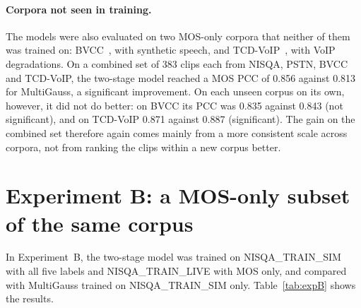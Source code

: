 \documentclass[
english,                 %
bibtex,                  %
includeExtraAbstracts, %
]{kththesis}
\numberwithin{listing}{chapter}
\begin{document}
\paragraph{Corpora not seen in training.} The models were also evaluated on two MOS-only corpora that neither of them was trained on: BVCC~\cite{cooper_ssw_2021}, with synthetic speech, and TCD-VoIP~\cite{harte_tcdvoip_2015}, with \gls{VoIP} degradations. On a combined set of 383 clips each from NISQA, PSTN, BVCC and TCD-VoIP, the two-stage model reached a MOS PCC of 0.856 against 0.813 for MultiGauss, a significant improvement. On each unseen corpus on its own, however, it did not do better: on BVCC its PCC was 0.835 against 0.843 (not significant), and on TCD-VoIP 0.871 against 0.887 (significant). The gain on the combined set therefore again comes mainly from a more consistent scale across corpora, not from ranking the clips within a new corpus better.

\section{Experiment B: a MOS-only subset of the same corpus}
\label{sec:resultsExpB}

In Experiment~B, the two-stage model was trained on NISQA\_TRAIN\_SIM with all five labels and NISQA\_TRAIN\_LIVE with MOS only, and compared with MultiGauss trained on NISQA\_TRAIN\_SIM only. Table~\ref{tab:expB} shows the results.
\end{document}
